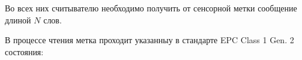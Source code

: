 \documentclass[12pt]{article}
\theoremstyle{definition}
\begin{document}
Во всех них считывателю необходимо получить от сенсорной метки сообщение длиной $N$ слов. %





В процессе чтения метка проходит указанныу в стандарте EPC Class 1 Gen. 2 \cite{StdGen2} состояния:
\end{document}
